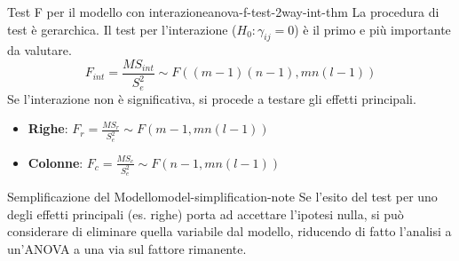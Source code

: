 \begin{table}[ht]
    \centering
    \caption{Tabella ANOVA a due fattori (caso con repliche) - Test di Ipotesi}
\end{table}

\begin{teorema}{Test F per il modello con
interazione}{anova-f-test-2way-int-thm}
La procedura di test è gerarchica. Il test per l'interazione (\(H_0:
\gamma_{ij} = 0\)) è il primo e più importante da valutare.
\[ F_{int} = \frac{MS_{int}}{S_e^2} \sim F((m-1)(n-1), mn(l-1)) \]
Se l'interazione non è significativa, si procede a testare gli effetti
principali.
\begin{itemize}
    \item \textbf{Righe}: \( F_r = \frac{MS_r}{S_e^2} \sim F(m-1, mn(l-1))\)
    \item \textbf{Colonne}: \( F_c = \frac{MS_c}{S_e^2} \sim F(n-1, mn(l-1))\)
\end{itemize}
\end{teorema}
\begin{nota}{Semplificazione del Modello}{model-simplification-note}
Se l'esito del test per uno degli effetti principali (es. righe) porta ad
accettare l'ipotesi nulla, si può considerare di eliminare quella variabile dal
modello, riducendo di fatto l'analisi a un'ANOVA a una via sul fattore
rimanente.
\end{nota}



